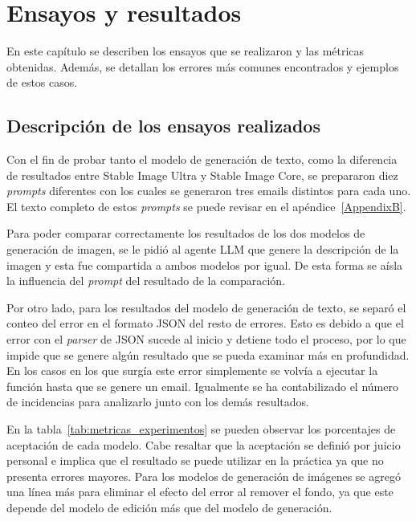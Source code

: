 
\chapter{Ensayos y resultados} %

\label{Chapter4} %

En este capítulo se describen los ensayos que se realizaron y las métricas obtenidas. Además, se detallan los errores más comunes encontrados y ejemplos de estos casos.

\section{Descripción de los ensayos realizados}
\label{sec:pruebasHW}

Con el fin de probar tanto el modelo de generación de texto, como la diferencia de resultados entre Stable Image Ultra y Stable Image Core, se prepararon diez \textit{prompts} diferentes con los cuales se generaron tres emails distintos para cada uno. El texto completo de estos \textit{prompts} se puede revisar en el apéndice~\ref{AppendixB}.

Para poder comparar correctamente los resultados de los dos modelos de generación de imagen, se le pidió al agente LLM que genere la descripción de la imagen y esta fue compartida a ambos modelos por igual. De esta forma se aísla la influencia del \textit{prompt} del resultado de la comparación.

Por otro lado, para los resultados del modelo de generación de texto, se separó el conteo del error en el formato JSON del resto de errores. Esto es debido a que el error con el \textit{parser} de JSON sucede al inicio y detiene todo el proceso, por lo que impide que se genere algún resultado que se pueda examinar más en profundidad. En los casos en los que surgía este error simplemente se volvía a ejecutar la función hasta que se genere un email. Igualmente se ha contabilizado el número de incidencias para analizarlo junto con los demás resultados.

En la tabla~\ref{tab:metricas_experimentos} se pueden observar los porcentajes de aceptación de cada modelo. Cabe resaltar que la aceptación se definió por juicio personal e implica que el resultado se puede utilizar en la práctica ya que no presenta errores mayores. Para los modelos de generación de imágenes se agregó una línea más para eliminar el efecto del error al remover el fondo, ya que este depende del modelo de edición más que del modelo de generación.

